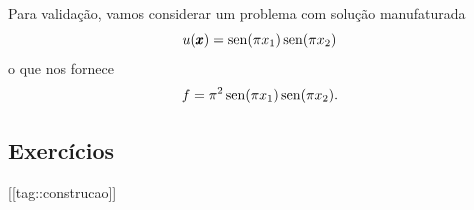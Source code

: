 Para validação, vamos considerar um problema com solução manufaturada
\begin{equation}
  u(\pmb{x}) = \operatorname{sen}(\pi x_1)\operatorname{sen}(\pi x_2)
\end{equation}
o que nos fornece
\begin{equation}
  f = \pi^2\operatorname{sen}(\pi x_1)\operatorname{sen}(\pi x_2).
\end{equation}




\subsection{Exercícios}

[[tag::construcao]]
